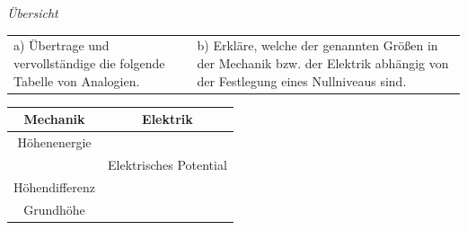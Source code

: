 \begin{aufgabe} \emph{Übersicht}
	
	\smallskip
	\begin{tabu} to \textwidth {X[L]X[L]}
		a) Übertrage und vervollständige die folgende Tabelle von Analogien.
		&
		b) Erkläre, welche der genannten Größen in der Mechanik bzw. der Elektrik abhängig von der Festlegung eines Nullniveaus sind.
		\\
	\end{tabu}
	
	\vspace{-0.5\baselineskip}
	\begin{minipage}{0.48\textwidth}
		\begin{tabular}{c|c}
			\textbf{Mechanik} & \textbf{Elektrik} \\ \hline
			Höhenenergie & \\ \hline
			& Elektrisches Potential \\ \hline
			Höhendifferenz & \\ \hline
			Grundhöhe & \\ \hline
		\end{tabular}
	\end{minipage}
	\hfill
\end{aufgabe}


